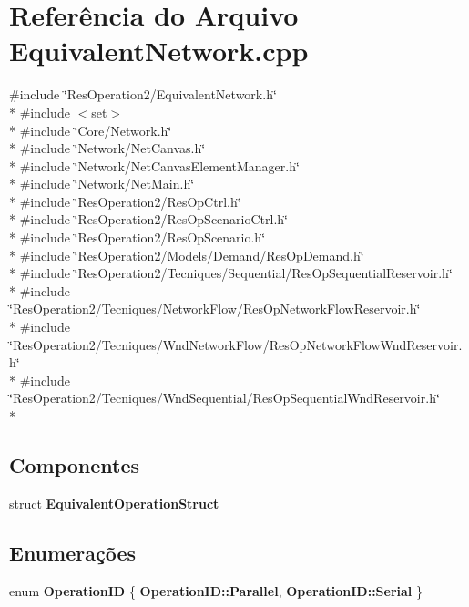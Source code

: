 \section{Referência do Arquivo Equivalent\+Network.\+cpp}
\label{_equivalent_network_8cpp}
{\ttfamily \#include \char`\"{}Res\+Operation2/\+Equivalent\+Network.\+h\char`\"{}}\\*
{\ttfamily \#include $<$set$>$}\\*
{\ttfamily \#include \char`\"{}Core/\+Network.\+h\char`\"{}}\\*
{\ttfamily \#include \char`\"{}Network/\+Net\+Canvas.\+h\char`\"{}}\\*
{\ttfamily \#include \char`\"{}Network/\+Net\+Canvas\+Element\+Manager.\+h\char`\"{}}\\*
{\ttfamily \#include \char`\"{}Network/\+Net\+Main.\+h\char`\"{}}\\*
{\ttfamily \#include \char`\"{}Res\+Operation2/\+Res\+Op\+Ctrl.\+h\char`\"{}}\\*
{\ttfamily \#include \char`\"{}Res\+Operation2/\+Res\+Op\+Scenario\+Ctrl.\+h\char`\"{}}\\*
{\ttfamily \#include \char`\"{}Res\+Operation2/\+Res\+Op\+Scenario.\+h\char`\"{}}\\*
{\ttfamily \#include \char`\"{}Res\+Operation2/\+Models/\+Demand/\+Res\+Op\+Demand.\+h\char`\"{}}\\*
{\ttfamily \#include \char`\"{}Res\+Operation2/\+Tecniques/\+Sequential/\+Res\+Op\+Sequential\+Reservoir.\+h\char`\"{}}\\*
{\ttfamily \#include \char`\"{}Res\+Operation2/\+Tecniques/\+Network\+Flow/\+Res\+Op\+Network\+Flow\+Reservoir.\+h\char`\"{}}\\*
{\ttfamily \#include \char`\"{}Res\+Operation2/\+Tecniques/\+Wnd\+Network\+Flow/\+Res\+Op\+Network\+Flow\+Wnd\+Reservoir.\+h\char`\"{}}\\*
{\ttfamily \#include \char`\"{}Res\+Operation2/\+Tecniques/\+Wnd\+Sequential/\+Res\+Op\+Sequential\+Wnd\+Reservoir.\+h\char`\"{}}\\*
\subsection*{Componentes}
\begin{DoxyCompactItemize}
\item 
struct {\bf Equivalent\+Operation\+Struct}
\end{DoxyCompactItemize}
\subsection*{Enumerações}
\begin{DoxyCompactItemize}
\item 
enum {\bf Operation\+ID} \{ {\bf Operation\+I\+D\+::\+Parallel}, 
{\bf Operation\+I\+D\+::\+Serial}
 \}
\end{DoxyCompactItemize}


